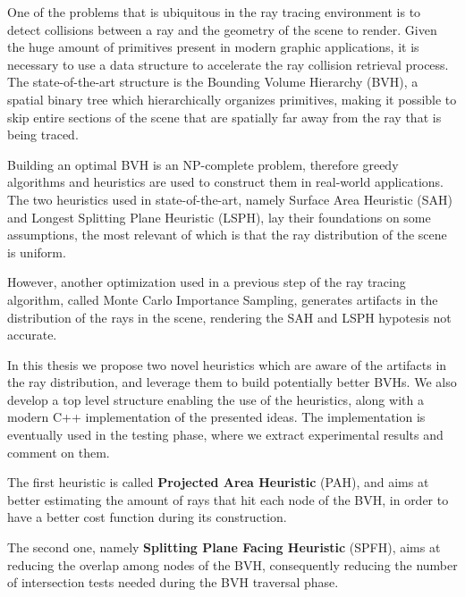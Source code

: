 \documentclass{PoliMi_MasterThesis}
\begin{document}
One of the problems that is ubiquitous in the ray tracing environment is to detect collisions between a ray and the geometry of the scene to render. Given the huge amount of primitives present in modern graphic applications, it is necessary to use a data structure to accelerate the ray collision retrieval process. The state-of-the-art structure is the Bounding Volume Hierarchy (BVH), a spatial binary tree which hierarchically organizes primitives, making it possible to skip entire sections of the scene that are spatially far away from the ray that is being traced. 

Building an optimal BVH is an NP-complete problem, therefore greedy algorithms and heuristics are used to construct them in real-world applications. The two heuristics used in state-of-the-art, namely Surface Area Heuristic (SAH) and Longest Splitting Plane Heuristic (LSPH), lay their foundations on some assumptions, the most relevant of which is that the ray distribution of the scene is uniform.

However, another optimization used in a previous step of the ray tracing algorithm, called Monte Carlo Importance Sampling, generates artifacts in the distribution of the rays in the scene, rendering the SAH and LSPH hypotesis not accurate.

In this thesis we propose two novel heuristics which are aware of the artifacts in the ray distribution, and leverage them to build potentially better BVHs. We also develop a top level structure enabling the use of the heuristics, along with a modern C++ implementation of the presented ideas. The implementation is eventually used in the testing phase, where we extract experimental results and comment on them.

The first heuristic is called \textbf{Projected Area Heuristic} (PAH), and aims at better estimating the amount of rays that hit each node of the BVH, in order to have a better cost function during its construction.

The second one, namely \textbf{Splitting Plane Facing Heuristic} (SPFH), aims at reducing the overlap among nodes of the BVH, consequently reducing the number of intersection tests needed during the BVH traversal phase.
\end{document}
